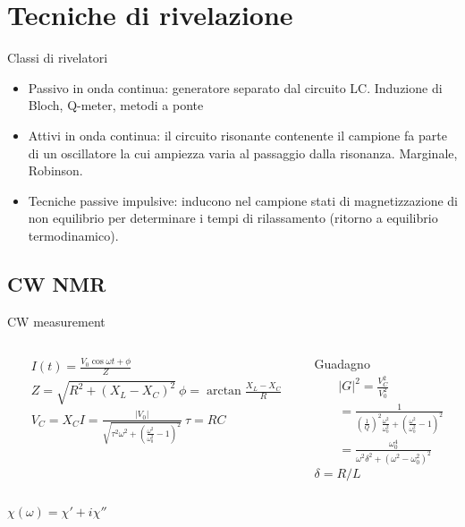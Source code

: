 \section{Tecniche di rivelazione}

\begin{frame}{Classi di rivelatori}
\begin{itemize}
\item Passivo in onda continua: generatore separato dal circuito LC. Induzione di Bloch, Q-meter, metodi a ponte
\item Attivi in onda continua: il circuito risonante contenente il campione fa parte di un oscillatore la cui ampiezza varia al passaggio dalla risonanza. Marginale, Robinson.
\item Tecniche passive impulsive: inducono nel campione stati di magnetizzazione di non equilibrio per determinare i tempi di rilassamento (ritorno a equilibrio termodinamico).
\end{itemize}
\end{frame}

\subsection{CW NMR}

\begin{frame}{CW measurement}
\begin{columns}  \begin{column}{0.5\textwidth}
\begin{align*}
&I(t)=\frac{V_0\cos{\omega t+\phi}}{Z}\\
&Z=\sqrt{R^2+(X_L-X_C)^2}\ \phi=\arctan{\frac{X_L-X_C}{R}}\\
&V_C=X_CI=\frac{|V_0|}{\sqrt{\tau^2\omega^2+(\frac{\omega^2}{\omega_0^2}-1)^2}}\ \tau=RC
\end{align*}
\end{column} \begin{column}{0.5\textwidth}
Guadagno
\begin{align*}
&|G|^2=\frac{V_C^2}{V_0^2}\\
&=\frac{1}{(\frac{1}{Q})^2 \frac{\omega^2}{\omega_0^2}+(\frac{\omega^2}{\omega_0^2}-1)^2}\\
&=\frac{\omega_0^4}{\omega^2\delta^2+(\omega^2-\omega_0^2)^2}
\end{align*}
$\delta=R/L$ 
\end{column}  \end{columns}
$\chi(\omega)=\chi'+i\chi''$
\end{frame}